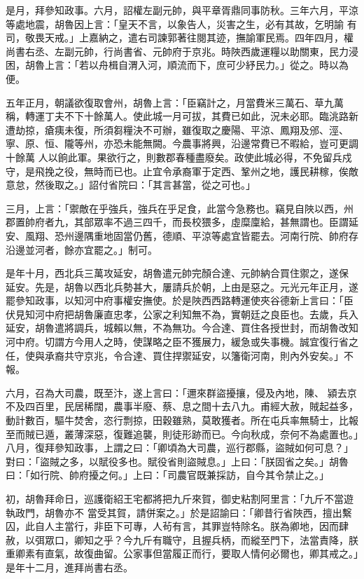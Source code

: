 \begin{pinyinscope}
 是月，拜參知政事。六月，詔權左副元帥，與平章胥鼎同事防秋。三年六月，平涼等處地震，胡魯因上言：「皇天不言，以象告人，災害之生，必有其故，乞明諭
 有司，敬畏天戒。」上嘉納之，遣右司諫郭著往閱其迹，撫諭軍民焉。四年四月，權尚書右丞、左副元帥，行尚書省、元帥府于京兆。時陜西歲運糧以助關東，民力浸困，胡魯上言：「若以舟楫自渭入河，順流而下，庶可少紓民力。」從之。時以為便。



 五年正月，朝議欲復取會州，胡魯上言：「臣竊計之，月當費米三萬石、草九萬稱，轉運丁夫不下十餘萬人。使此城一月可拔，其費已如此，況未必耶。臨洮路新遭劫掠，瘡痍未復，所須芻糧決不可辦，雖復取之慶陽、平涼、鳳翔及邠、涇、寧、原、恒、隴等州，亦恐未能無闕。今農事將興，沿邊常費已不暇給，豈可更調十餘萬
 人以餉此軍。果欲行之，則數郡春種盡廢矣。政使此城必得，不免留兵戍守，是飛挽之役，無時而已也。止宜令承裔軍于定西、鞏州之地，護民耕稼，俟敵意怠，然後取之。」詔付省院曰：「其言甚當，從之可也。」



 三月，上言：「禦敵在乎強兵，強兵在乎足食，此當今急務也。竊見自陜以西，州郡置帥府者九，其部眾率不過三四千，而長校猥多，虛糜廩給，甚無謂也。臣謂延安、風翔、恐州邊隅重地固當仍舊，德順、平涼等處宜皆罷去。河南行院、帥府存沿邊並河者，餘亦宜罷之。」制可。



 是年十月，西北兵三萬攻延安，胡魯遣元帥完顏合達、元帥納合買住禦之，遂保
 延安。先是，胡魯以西北兵勢甚大，屢請兵於朝，上由是惡之。元光元年正月，遂罷參知政事，以知河中府事權安撫使。於是陜西西路轉運使夾谷德新上言曰：「臣伏見知河中府把胡魯廉直忠孝，公家之利知無不為，實朝廷之良臣也。去歲，兵入延安，胡魯遣將調兵，城賴以無，不為無功。今合達、買住各授世封，而胡魯改知河中府。切謂方今用人之時，使謀略之臣不獲展力，緩急或失事機。誠宜復行省之任，使與承裔共守京兆，令合達、買住捍禦延安，以籓衛河南，則內外安矣。」不報。



 六月，召為大司農，既至汴，遂上言曰：「邇來群盜擾攘，侵及內地，陳、
 潁去京不及四百里，民居稀闊，農事半廢、蔡、息之間十去八九。甫經大赦，賊起益多，動計數百，驅牛焚舍，恣行剽掠，田穀雖熟，莫敢獲者。所在屯兵率無騎士，比報至而賊已遁，叢薄深惡，復難追襲，則徒形跡而已。今向秋成，奈何不為處置也。」八月，復拜參知政事，上謂之曰：「卿頃為大司農，巡行郡縣，盜賊如何可息？」對曰：「盜賊之多，以賦役多也。賦役省則盜賊息。」上曰：「朕固省之矣。」胡魯曰：「如行院、帥府擾之何。」上曰：「司農官既兼採訪，自今其令禁止之。」



 初，胡魯拜命日，巡護衛紹王宅都將把九斤來賀，御史粘割阿里言：「九斤不當遊執政門，胡魯亦不
 當受其賀，請併案之。」於是詔諭曰：「卿昔行省陜西，擅出繫囚，此自人主當行，非臣下可專，人茍有言，其罪豈特除名。朕為卿地，因而肆赦，以弭眾口，卿知之乎？今九斤有職守，且握兵柄，而縱至門下，法當責降，朕重卿素有直氣，故復曲留。公家事但當履正而行，要取人情何必爾也，卿其戒之。」是年十二月，進拜尚書右丞。




\end{pinyinscope}
